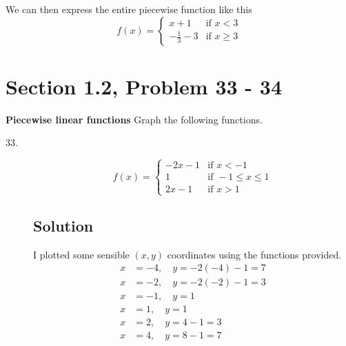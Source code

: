 \documentclass{article}
\newcommand{\problem}[2]{\vspace{5ex}\section*{Section #1, Problem #2}}
\newcommand{\solution}{\subsection*{Solution}}
\begin{document}
\begin{description}
\begin{description}
  \end{description}
  We can then express the entire piecewise function like this
  \[
    f(x) = \begin{cases}
             x + 1 &\text{if } x < 3 \\
             -\frac{1}{3} - 3 &\text{if } x \geq 3
           \end{cases}
  \]
\end{description}

\problem{1.2}{33 \-- 34}
\textbf{Piecewise linear functions} Graph the following functions.

\begin{description}
\item[33.]
  \[
    f(x) = \begin{cases}
             -2x - 1 &\text{if } x < -1 \\
             1 &\text{if } -1 \leq x \leq 1 \\
             2x - 1 &\text{if } x > 1
           \end{cases}
  \]
  \solution{}
  \begin{multicols}{2}
  I plotted some sensible $(x,y)$ coordinates using the functions provided.
  \begin{align*}
    x &= -4, \quad y = -2(-4)-1 = 7 \\
    x &= -2, \quad y = -2(-2)-1 = 3 \\
    x &= -1, \quad y = 1 \\
    x &= 1, \quad y = 1 \\
    x &= 2, \quad y = 4 - 1 = 3 \\
    x &= 4, \quad y = 8-1 = 7 \\
  \end{align*}

  \columnbreak\
  \begin{figure}[H]
    \end{figure}
  \end{multicols}


\end{description}
\end{document}
